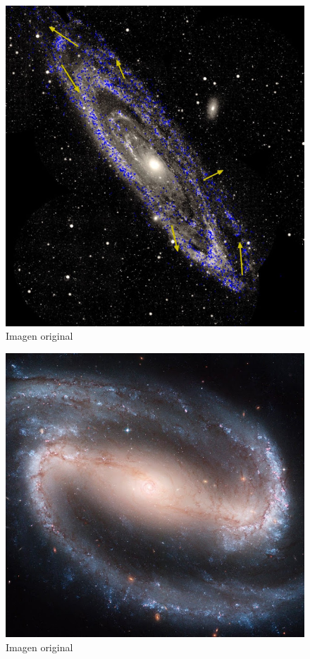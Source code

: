 \documentclass[10pt,journal,compsoc]{IEEEtran}\usepackage[T1]{fontenc}                              %
\begin{document}
\begin{figure}[!h]
	\caption{Imagen original}
	\centering
	\includegraphics*[scale=0.2]{im1}
	\centering
\end{figure}


\begin{figure}[!h]
	\caption{Imagen original}
	\centering
	\includegraphics*[scale=0.2]{im2}
	\centering
\end{figure}
\end{document}
